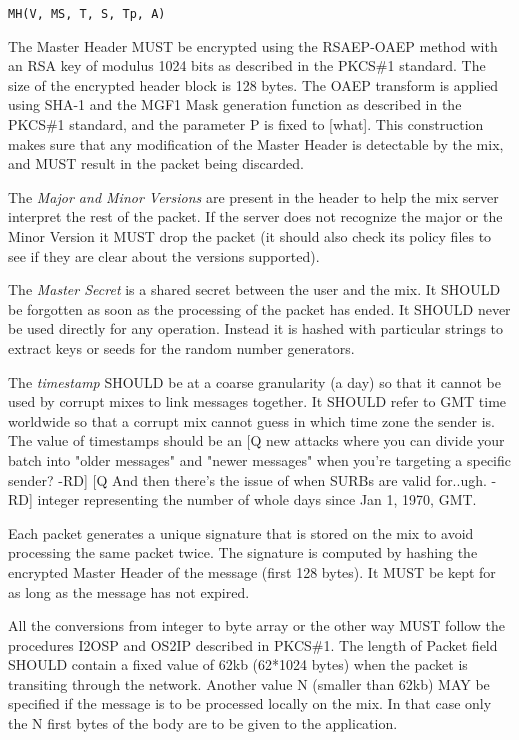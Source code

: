 \documentclass{article}
\begin{document}
\begin{verbatim}MH(V, MS, T, S, Tp, A)\end{verbatim}

The Master Header MUST be encrypted using the RSAEP-OAEP method with
an RSA key of modulus 1024 bits as described in the PKCS\#1
standard. The size of the encrypted header block is 128 bytes. The
OAEP transform is applied using SHA-1 and the MGF1 Mask 
generation function as described in the PKCS\#1 standard, and the 
parameter P is fixed to [what]. This construction 
makes sure that any modification of the Master Header is detectable by 
the mix, and MUST result in the packet being discarded.

The \emph{Major and Minor Versions} are present in the header to help the mix
server interpret the rest of the packet. If the server does not recognize
the major or the Minor Version it MUST drop the packet (it should also check
its policy files to see if they are clear about the versions supported).

The \emph{Master Secret} is a shared secret between the user and the
mix. It SHOULD be forgotten as soon as the processing of the packet
has ended. It SHOULD never be used directly for any operation. Instead
it is hashed with particular strings to extract keys or seeds for the
random number generators.

The \emph{timestamp} SHOULD be at a coarse granularity (a day) so that
it cannot be used by corrupt mixes to link messages together. It
SHOULD refer to GMT time worldwide so that a corrupt mix cannot guess
in which time zone the sender is. The value of timestamps should be an
%
[Q new attacks where you can divide your batch into "older messages"
and "newer messages" when you're targeting a specific sender? -RD]
[Q And then there's the issue of when SURBs are valid for..ugh. -RD]
%
integer representing the number of whole days since Jan 1, 1970, GMT.

Each packet generates a unique signature that is stored on the mix to avoid 
processing the same packet twice. The signature is computed by hashing the
encrypted Master Header of the message (first 128 bytes). It MUST be kept for
as long as the message has not expired.

All the conversions from integer to byte array or the other way MUST
follow the procedures I2OSP and OS2IP described in PKCS\#1. The length
of Packet field SHOULD contain a fixed value of 62kb (62*1024 bytes)
when the packet is transiting through the network. Another value N
(smaller than 62kb) MAY be specified if the message is to be processed
locally on the mix. In that case only the N first bytes of the body
are to be given to the application.  
\end{document}

